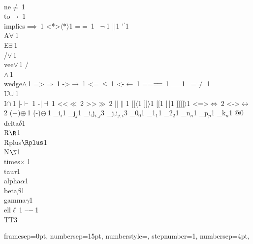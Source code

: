 {		{\\ne}{{$\ne\ $}}1
		{\\to}{{$\to\ $}}1
		{\\implies}{{$\implies\ $}}1
		{<*>}{{$\langle*\rangle$}}1
		{=}{{$=\ $}}1
		{~}{{$\neg\ $}}1
		{|}{{$\mid$}}1
		{'}{{$^\prime$}}1
		{\\A}{{$\forall\ $}}1
		{\\E}{{$\exists\ $}}1
		{\\/}{{$\vee\,$}}1
		{\\vee}{{$\vee\,$}}1
		{/\\}{{$\wedge\,$}}1
		{\\wedge}{{$\wedge\,$}}1
		{=>}{{$\Rightarrow\ $}}1
		{->}{{$\rightarrow\ $}}1
		{<=}{{$\ \leq\ $}}1
		{<-}{{$\leftarrow\ $}}1
		{==}{{$=\mathrel{\mkern-3mu}=\ $}}1
		{_}{{\_}}1
		{~=}{{$\neq\ $}}1
		{\\U}{{$\cup\ $}}1
		{\\I}{{$\cap\ $}}1
		{|-}{{$\vdash\ $}}1
		{-|}{{$\dashv\ $}}1
		{<<}{{$\ll\ $}}2
		{>>}{{$\gg\ $}}2
		{||}{{$\|$}}1
		{[[}{{$\langle$}}1
		{]]}{{$\rangle$}}1
		{[}{{$[$}}1
		{]}{{$\,]$}}1
		{]]]}{{$]\rangle$}}1
		{<=>}{{$\Leftrightarrow\ $}}2
		{<->}{{$\leftrightarrow\ $}}2
		{(+)}{{$\oplus\ $}}1
		{(-)}{{$\ominus\ $}}1
		{_i}{{$_{i}$}}1
		{_j}{{$_{j}$}}1
		{_{i,j}}{{$_{i,j}$}}3
		{_{j,i}}{{$_{j,i}$}}3
		{_0}{{$_0$}}1
		{_1}{{$_1$}}1
		{_2}{{$_2$}}1
		{_n}{{$_n$}}1
		{_p}{{$_p$}}1
		{_k}{{$_n$}}1
		{@}{{}}0
		{\\delta}{{$\delta$}}1
		{\\R}{{$\R$}}1
		{\\Rplus}{{$\Rplus$}}1
		{\\N}{{$\N$}}1
		{\\times}{{$\times\ $}}1
		{\\tau}{{$\tau$}}1
		{\\alpha}{{$\alpha$}}1
		{\\beta}{{$\beta$}}1
		{\\gamma}{{$\gamma$}}1
		{\\ell}{{$\ell\ $}}1
		{--}{{$-\ $}}1
		{\\TT}{{\hspace{1.5em}}}3
	}

    {
        framesep=0pt,
        numbersep=15pt,
        numberstyle=\tiny,
        stepnumber=1,
        numbersep=4pt,
    }
	
